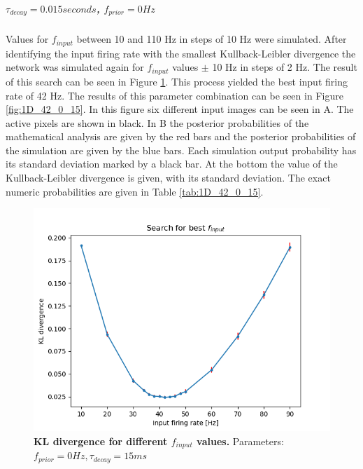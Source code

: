 \subparagraph{$\tau_{decay} = 0.015 seconds$, $f_{prior} = 0 Hz$}
Values for $f_{input}$ between 10 and 110 Hz in steps of 10 Hz were simulated. After identifying the input firing rate with the smallest Kullback-Leibler divergence the network was simulated again for $f_{input}$ values $\pm$ 10 Hz in steps of 2 Hz. The result of this search can be seen in Figure \ref{fig:1D_KLD_fPrior0_tau15}. This process yielded the best input firing rate of 42 Hz. The results of this parameter combination can be seen in Figure \ref{fig:1D_42_0_15}. In this figure six different input images can be seen in A. The active pixels are shown in black. In B the posterior probabilities of the mathematical analysis are given by the red bars and the posterior probabilities of the simulation are given by the blue bars. Each simulation output probability has its standard deviation marked by a black bar. At the bottom the value of the Kullback-Leibler divergence is given, with its standard deviation. The exact numeric probabilities are given in Table \ref{tab:1D_42_0_15}.

\begin{figure}
  \includegraphics[width=\linewidth]{figures/1D/KLDvsfInput_fPrior0tau15.png}
  \caption{\textbf{KL divergence for different $f_{input}$ values. } Parameters: $f_{prior} = 0 Hz, \tau_{decay} = 15 ms$}
  \label{fig:1D_KLD_fPrior0_tau15}
\end{figure}

